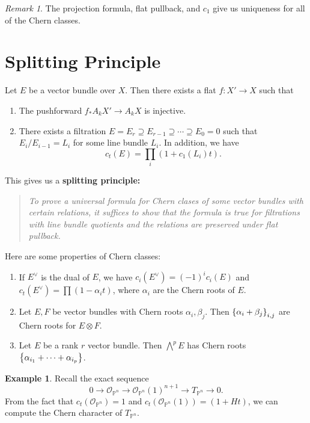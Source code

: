 \documentclass[leqno, openany]{memoir}
\theoremstyle{definition}
\newtheorem{exm}[thm]{Example}
\theoremstyle{remark}
\newtheorem{rmk}[thm]{Remark}
\theoremstyle{plain}
\theoremstyle{definition}
\theoremstyle{remark}
\renewcommand{\P}{\mathbb{P}}
\newcommand{\mc}[1]{\mathcal{#1}}
\begin{document}
\begin{rmk}
    The projection formula, flat pullback, and $c_1$ give us uniqueness for all of the Chern classes.
\end{rmk}

\section{Splitting Principle}%
\label{sec:splitting_construction}

Let $E$ be a vector bundle over $X$. Then there exists a flat $f \colon X' \to X$ such that
\begin{enumerate}
    \item The pushforward $f_* A_k X' \to A_k X$ is injective.
    \item There exists a filtration $E = E_r \supseteq E_{r-1} \supseteq \cdots \supseteq E_0 = 0$ such that $E_i / E_{i-1} = L_i$ for some line bundle $L_i$. In addition, we have
        \[ c_t(E) = \prod_i (1 + c_1(L_i) t). \]
\end{enumerate}

This gives us a \textbf{splitting principle:}
\begin{quotation}
    \textit{To prove a universal formula for Chern clases of some vector bundles with certain relations, it suffices to show that the formula is true for filtrations with line bundle quotients and the relations are preserved under flat pullback.}
\end{quotation}
Here are some properties of Chern classes:
\begin{enumerate}
    \item If $E^{\vee}$ is the dual of $E$, we have $c_i(E^{\vee}) = {(-1)}^i c_i(E)$ and $c_t(E^{\vee}) = \prod (1 - \alpha_i t)$, where $\alpha_i$ are the Chern roots of $E$.
    \item Let $E, F$ be vector bundles with Chern roots $\alpha_i, \beta_j$. Then $\qty{\alpha_i + \beta_j}_{i,j}$ are Chern roots for $E \otimes F$.
    \item Let $E$ be a rank $r$ vector bundle. Then $\bigwedge^p E$ has Chern roots $\qty{\alpha_{i_1} + \cdots + \alpha_{i_p}}$.
\end{enumerate}

\begin{exm}
    Recall the exact sequence
    \[ 0 \to \mc{O}_{\P^n} \to \mc{O}_{\P^n}(1)^{n+1} \to T_{\P^n} \to 0. \]
    From the fact that $c_t(\mc{O}_{\P^n}) = 1$ and $c_t(\mc{O}_{\P^n}(1)) = (1+H t)$, we can compute the Chern character of $T_{\P^n}$.
\end{exm}
\end{document}
